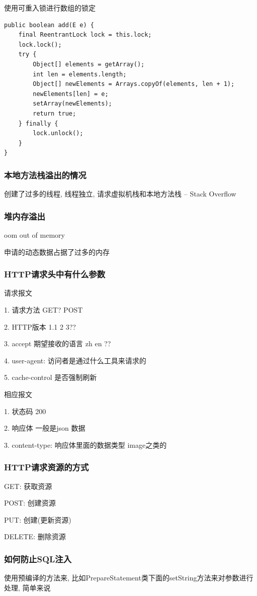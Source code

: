 使用可重入锁进行数组的锁定

\begin{lstlisting}
public boolean add(E e) {
	final ReentrantLock lock = this.lock;
	lock.lock();
	try {
		Object[] elements = getArray();
		int len = elements.length;
		Object[] newElements = Arrays.copyOf(elements, len + 1);
		newElements[len] = e;
		setArray(newElements);
		return true;
	} finally {
		lock.unlock();
	}
}
\end{lstlisting}
\subsubsection{本地方法栈溢出的情况}
创建了过多的线程, 线程独立, 请求虚拟机栈和本地方法栈 -- Stack Overflow

\subsubsection{堆内存溢出}
oom out of memory

申请的动态数据占据了过多的内存


\subsubsection{HTTP请求头中有什么参数}
请求报文


1. 请求方法 GET? POST

2. HTTP版本 1.1 2 3??

3. accept 期望接收的语言 zh en ??

4. user-agent: 访问者是通过什么工具来请求的

5. cache-control 是否强制刷新


相应报文

1. 状态码 200

2. 响应体 一般是json 数据

3. content-type: 响应体里面的数据类型  image之类的
\subsubsection{HTTP请求资源的方式}
GET: 获取资源

POST: 创建资源

PUT: 创建(更新资源)

DELETE: 删除资源
\subsubsection{如何防止SQL注入}
使用预编译的方法来, 比如PrepareStatement类下面的setString方法来对参数进行处理, 简单来说
